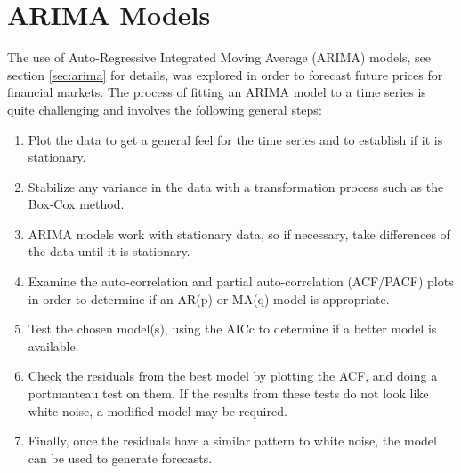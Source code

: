 %


\section{ARIMA Models}
\label{arima_models}
The use of Auto-Regressive Integrated Moving Average (ARIMA) models, see section \ref{sec:arima} for details, was explored in order to forecast future prices for financial markets. 
The process of fitting an ARIMA model to a time series is quite challenging and involves the following general steps:

\begin{enumerate}
\item Plot the data to get a general feel for the time series and to establish if it is stationary.
\item Stabilize any variance in the data with a transformation process such as the Box-Cox method.
\item ARIMA models work with stationary data, so if necessary, take differences of the data until it is stationary.
\item Examine the auto-correlation and partial auto-correlation (ACF/PACF) plots in order to determine if an AR(p) or MA(q) model is appropriate.
\item Test the chosen model(s), using the AICc to determine if a better model is available.
\item Check the residuals from the best model by plotting the ACF, and doing a portmanteau test on them. If the results from these tests do not look like white noise, a modified model may be required.
\item Finally, once the residuals have a similar pattern to white noise, the model can be used to generate forecasts.
\end{enumerate}


